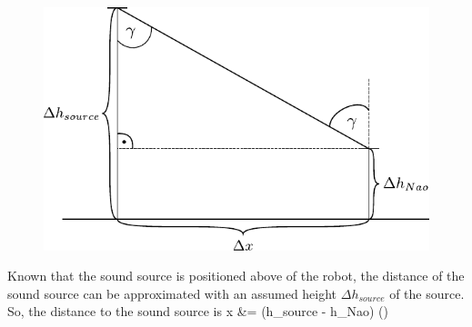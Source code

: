 \eal \esub
\begin{figure}[ht]
	\centering
		\includegraphics[width=0.6\columnwidth]{figures/x_distance}
	\caption{}
    \label{fig:02_xDistance}
\end{figure}
Known that the sound source is positioned above of the robot, the distance
of the sound source can be approximated with an assumed height $\Delta h_{source}$
of the source.
So, the distance to the sound source is
\bsub \bal
\Delta x &= (\Delta h_{source} - \Delta h_{Nao}) \cdot \tan(\gamma)
\eal \esub
